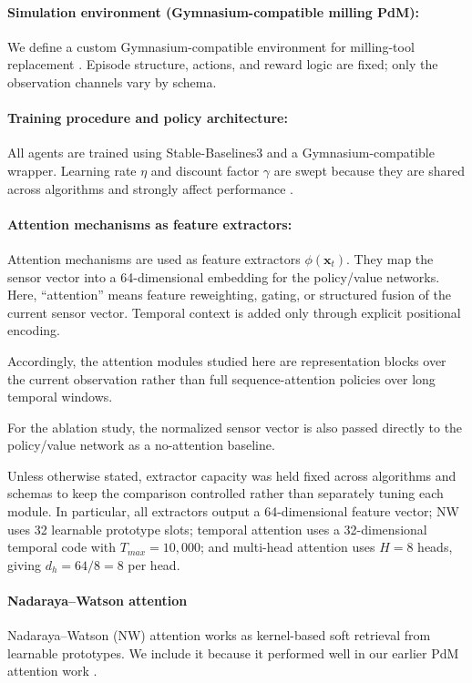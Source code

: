 \documentclass[sn-basic]{sn-jnl}%
\begin{document}
\paragraph{Simulation environment (Gymnasium-compatible milling PdM):}
We define a custom Gymnasium-compatible environment for milling-tool replacement \cite{Foundation2023}. Episode structure, actions, and reward logic are fixed; only the observation channels vary by schema.

\paragraph{Training procedure and policy architecture:}
All agents are trained using Stable-Baselines3 and a Gymnasium-compatible wrapper. Learning rate $\eta$ and discount factor $\gamma$ are swept because they are shared across algorithms and strongly affect performance \cite{Henderson2019, Shala2022AutoRL, Eimer2023}.
  
\paragraph{Attention mechanisms as feature extractors:}
\label{sec:attention}

Attention mechanisms are used as feature extractors $\phi(\mathbf{x}_t)$. They map the sensor vector into a 64-dimensional embedding for the policy/value networks. Here, ``attention'' means feature reweighting, gating, or structured fusion of the current sensor vector. Temporal context is added only through explicit positional encoding.

Accordingly, the attention modules studied here are representation blocks over the current observation rather than full sequence-attention policies over long temporal windows.

For the ablation study, the normalized sensor vector is also passed directly to the policy/value network as a no-attention baseline.

Unless otherwise stated, extractor capacity was held fixed across algorithms and schemas to keep the comparison controlled rather than separately tuning each module. In particular, all extractors output a 64-dimensional feature vector; NW uses 32 learnable prototype slots; temporal attention uses a 32-dimensional temporal code with $T_{max}=10{,}000$; and multi-head attention uses $H=8$ heads, giving $d_h=64/8=8$ per head.

\paragraph{Nadaraya--Watson attention}
Nadaraya--Watson (NW) attention works as kernel-based soft retrieval from learnable prototypes. We include it because it performed well in our earlier PdM attention work \cite{Siraskar2024}.
\end{document}
